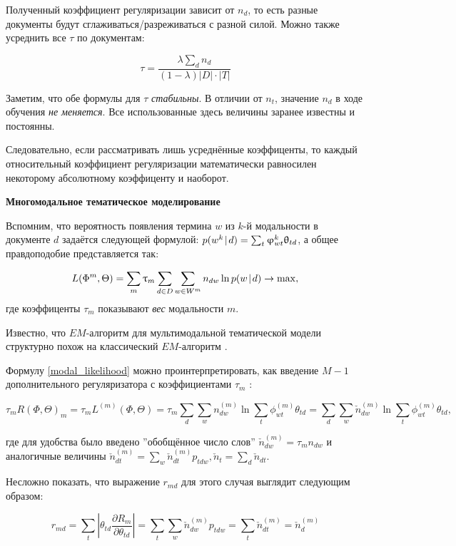 Полученный коэффициент регуляризации зависит от $n_d$, то есть разные документы будут сглаживаться/разреживаться с разной силой. Можно также усреднить все $\tau$ по документам:

\[
\tau = \frac{\lambda \sum_d n_d }{(1-\lambda) |D| \cdot |T|} 
\]

Заметим, что обе формулы для $\tau$ \textit{стабильны}. В отличии от $n_t$, значение $n_d$ в ходе обучения \emph{не меняется}. Все использованные здесь величины заранее известны и постоянны.

Следовательно, если рассматривать лишь усреднённые коэффиценты, то каждый относительный коэффициент регуляризации математически равносилен некоторому абсолютному коэффиценту и наоборот.

\textbf{Многомодальное тематическое моделирование}


Вспомним, что вероятность появления термина $w$ из $k$-й модальности в документе $d$ задаётся следующей формулой:
$p(w^k \mspace{2mu}{|}\mspace{2mu} d) = \sum_t \upvarphi_{wt}^k \uptheta_{td}$, а общее правдоподобие представляется так:

\[
L(\Phi^m, \Theta) = \sum_m \uptau_m \sum_{d\in D} \sum_{w \in W^m} n_{dw} \ln p(w \mspace{2mu}{|}\mspace{2mu} d) \rightarrow \max, \label{modal_likelihood}
\]
где коэффиценты $\tau_m$ показывают \textit{вес} модальности $m$.

Известно, что $EM$-алгоритм для мультимодальной тематической модели структурно похож на классический $EM$-алгоритм \cite{yanina}\cite{vorontsov2015non}\cite{bulatov}. 

Формулу \ref{modal_likelihood} можно проинтерпретировать, как введение $M-1$ дополнительного регуляризатора с коэффициентами $\tau_m$ \cite{yanina}:

\[
\tau_m R(\Phi, \Theta)_m = \tau_m L^{(m)}(\Phi, \Theta) = \tau_m  \sum_d \sum_w n_{dw}^{(m)} \ln \sum_t \phi_{wt}^{(m)}\theta_{td} = 
\sum_d \sum_w \check{n}_{dw}^{(m)} \ln \sum_t \phi_{wt}^{(m)}\theta_{td},
\]

где для удобства было введено ''обобщённое число слов'' $\check{n}_{dw}^{(m)} = \tau_m n_{dw}$ и аналогичные величины $\check{n}_{dt}^{(m)} = \sum_w \check{n}_{dt}^{(m)} p_{tdw}, \check{n}_t = \sum_d \check{n}_{dt}$.

Несложно показать, что выражение $r_{md}$ для этого случая выглядит следующим образом:

\[
r_{md} = \sum_t |\theta_{td} \frac{\partial R_m}{\partial \theta_{td}}| = \sum_t \sum_w \check{n}_{dw}^{(m)} p_{tdw} = \sum_t  \check{n}_{dt}^{(m)} = \check{n}_{d}^{(m)}
\]

